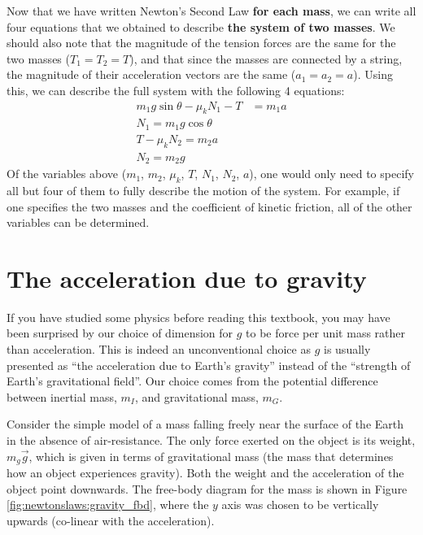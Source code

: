 \begin{example}
Now that we have written Newton's Second Law \textbf{for each mass}, we can write all four equations that we obtained to describe \textbf{the system of two masses}. We should also note that the magnitude of the tension forces are the same for the two masses ($T_1=T_2=T$), and that since the masses are connected by a string, the magnitude of their acceleration vectors are the same ($a_1=a_2=a$). Using this, we can describe the full system with the following 4 equations:
\begin{align*}
m_1 g\sin\theta -\mu_k N_1 - T &= m_1 a\\
N_1=m_1g\cos\theta\\
T - \mu_k N_2 = m_2 a\\
N_2 = m_2g
\end{align*}
Of the variables above ($m_1$, $m_2$, $\mu_k$, $T$, $N_1$, $N_2$, $a$), one would only need to specify all but four of them to fully describe the motion of the system. For example, if one specifies the two masses and the coefficient of kinetic friction, all of the other variables can be determined.

\end{example}

\section{The acceleration due to gravity}
If you have studied some physics before reading this textbook, you may have been surprised by our choice of dimension for $g$ to be force per unit mass rather than acceleration. This is indeed an unconventional choice as $g$ is usually presented as ``the acceleration due to Earth's gravity'' instead of the ``strength of Earth's gravitational field''. Our choice comes from the potential difference between inertial mass, $m_I$, and gravitational mass, $m_G$.

Consider the simple model of a mass falling freely near the surface of the Earth in the absence of air-resistance. The only force exerted on the object is its weight, $m_g\vec g$, which is given in terms of gravitational mass (the mass that determines how an object experiences gravity). Both the weight and the acceleration of the object point downwards. The free-body diagram for the mass is shown in Figure \ref{fig:newtonslaws:gravity_fbd}, where the $y$ axis was chosen to be vertically upwards (co-linear with the acceleration).


